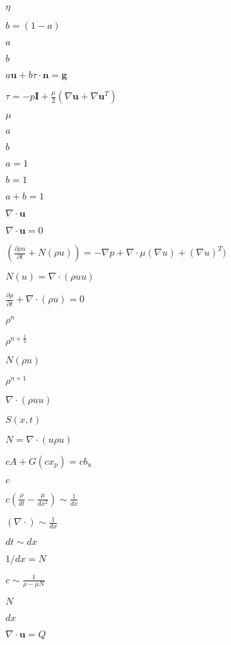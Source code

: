 \documentclass{article}
\begin{document}
$ \eta $
\pagebreak

$ b = (1-a) $
\pagebreak

$a$
\pagebreak

$b$
\pagebreak

$ a\mathbf{u} + b\tau\cdot\mathbf{n} = \mathbf{g}$
\pagebreak

$\tau = -p\mathbf{I} + \frac{\mu}{2}\left(\nabla\mathbf{u} + \nabla\mathbf{u}^T\right)$
\pagebreak

$\mu$
\pagebreak

$ a$
\pagebreak

$ b $
\pagebreak

$ a = 1 $
\pagebreak

$b = 1$
\pagebreak

$a + b = 1$
\pagebreak

$ \nabla \cdot \mathbf{u} $
\pagebreak

$ \nabla \cdot \mathbf{u} = 0 $
\pagebreak

$(\frac{\partial \rho u}{\partial t} + N(\rho u)) = -\nabla p + \nabla \cdot \mu (\nabla u) + (\nabla u)^T )$
\pagebreak

$ N(u) = \nabla \cdot (\rho u u) $
\pagebreak

$ \frac{\partial \rho}{\partial t} + \nabla \cdot (\rho u) = 0 $
\pagebreak

$\rho^n$
\pagebreak

$\rho^{n+\frac{1}{2}}$
\pagebreak

$N(\rho u)$
\pagebreak

$\rho^{n+1}$
\pagebreak

$ \nabla \cdot (\rho u u)$
\pagebreak

$ S(x,t) $
\pagebreak

$N = \nabla \cdot (u \rho u)$
\pagebreak

$ c A + G(c x_p) = c b_u$
\pagebreak

$ c $
\pagebreak

$ c(\frac{\rho}{dt} - \frac{\mu}{dx^2}) \sim \frac{1}{dx} $
\pagebreak

$ (\nabla \cdot) \sim \frac{1}{dx} $
\pagebreak

$ dt \sim dx $
\pagebreak

$ 1/dx = N $
\pagebreak

$ c \sim \frac{1}{\rho - \mu N} $
\pagebreak

$ N $
\pagebreak

$ dx $
\pagebreak

$ \nabla \cdot \mathbf{u} = Q $
\pagebreak
\end{document}
